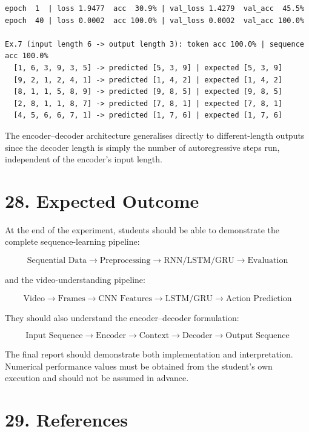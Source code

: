 \documentclass[10pt]{article}
\begin{document}
\begin{verbatim}
epoch  1  | loss 1.9477  acc  30.9% | val_loss 1.4279  val_acc  45.5%
epoch  40 | loss 0.0002  acc 100.0% | val_loss 0.0002  val_acc 100.0%

Ex.7 (input length 6 -> output length 3): token acc 100.0% | sequence acc 100.0%
  [1, 6, 3, 9, 3, 5] -> predicted [5, 3, 9] | expected [5, 3, 9]
  [9, 2, 1, 2, 4, 1] -> predicted [1, 4, 2] | expected [1, 4, 2]
  [8, 1, 1, 5, 8, 9] -> predicted [9, 8, 5] | expected [9, 8, 5]
  [2, 8, 1, 1, 8, 7] -> predicted [7, 8, 1] | expected [7, 8, 1]
  [4, 5, 6, 6, 7, 1] -> predicted [1, 7, 6] | expected [1, 7, 6]
\end{verbatim}

The encoder--decoder architecture generalises directly to
different-length outputs since the decoder length is simply the number of
autoregressive steps run, independent of the encoder's input length.

\section*{28. Expected Outcome}

At the end of the experiment, students should be able to demonstrate the
complete sequence-learning pipeline:

\[
\boxed{
\text{Sequential Data}
\rightarrow
\text{Preprocessing}
\rightarrow
\text{RNN/LSTM/GRU}
\rightarrow
\text{Evaluation}
}
\]

and the video-understanding pipeline:

\[
\boxed{
\text{Video}
\rightarrow
\text{Frames}
\rightarrow
\text{CNN Features}
\rightarrow
\text{LSTM/GRU}
\rightarrow
\text{Action Prediction}
}
\]

They should also understand the encoder--decoder formulation:

\[
\boxed{
\text{Input Sequence}
\rightarrow
\text{Encoder}
\rightarrow
\text{Context}
\rightarrow
\text{Decoder}
\rightarrow
\text{Output Sequence}
}
\]

The final report should demonstrate both implementation and interpretation.
Numerical performance values must be obtained from the student's own
execution and should not be assumed in advance.

\section*{29. References}
\end{document}
